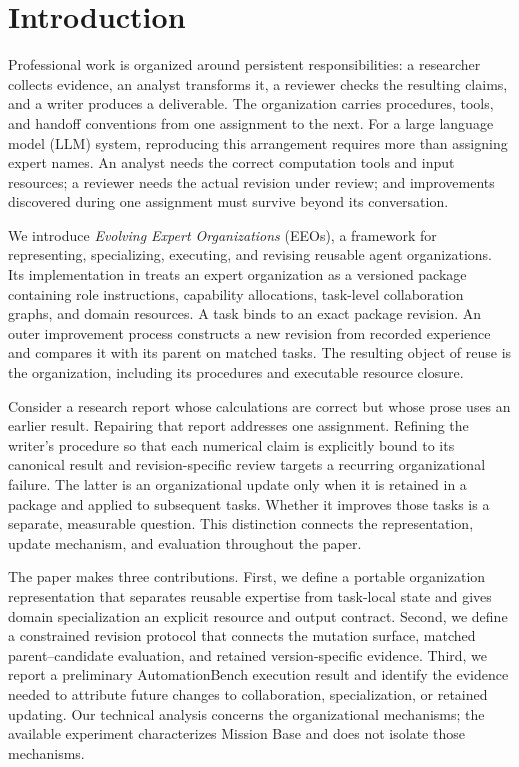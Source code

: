 \section{Introduction}
Professional work is organized around persistent responsibilities: a researcher collects evidence, an analyst transforms it, a reviewer checks the resulting claims, and a writer produces a deliverable. The organization carries procedures, tools, and handoff conventions from one assignment to the next. For a large language model (LLM) system, reproducing this arrangement requires more than assigning expert names. An analyst needs the correct computation tools and input resources; a reviewer needs the actual revision under review; and improvements discovered during one assignment must survive beyond its conversation.

We introduce \emph{Evolving Expert Organizations} (EEOs), a framework for representing, specializing, executing, and revising reusable agent organizations. Its implementation in \oc{} treats an expert organization as a versioned package containing role instructions, capability allocations, task-level collaboration graphs, and domain resources. A task binds to an exact package revision. An outer improvement process constructs a new revision from recorded experience and compares it with its parent on matched tasks. The resulting object of reuse is the organization, including its procedures and executable resource closure.

Consider a research report whose calculations are correct but whose prose uses an earlier result. Repairing that report addresses one assignment. Refining the writer's procedure so that each numerical claim is explicitly bound to its canonical result and revision-specific review targets a recurring organizational failure. The latter is an organizational update only when it is retained in a package and applied to subsequent tasks. Whether it improves those tasks is a separate, measurable question. This distinction connects the representation, update mechanism, and evaluation throughout the paper.

The paper makes three contributions. First, we define a portable organization representation that separates reusable expertise from task-local state and gives domain specialization an explicit resource and output contract. Second, we define a constrained revision protocol that connects the mutation surface, matched parent--candidate evaluation, and retained version-specific evidence. Third, we report a preliminary AutomationBench execution result and identify the evidence needed to attribute future changes to collaboration, specialization, or retained updating. Our technical analysis concerns the organizational mechanisms; the available experiment characterizes Mission Base and does not isolate those mechanisms.

